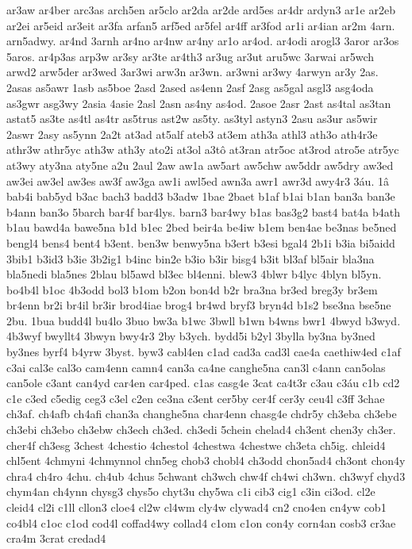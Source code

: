 {ar3aw
ar4ber
arc3as
arch5en
ar5clo
ar2da
ar2de
ard5es
ar4dr
ardyn3
ar1e
ar2eb
ar2ei
ar5eid
ar3eit
ar3fa
arfan5
arf5ed
ar5fel
ar4ff
ar3fod
ar1i
ar4ian
ar2m
4arn.
arn5adwy.
ar4nd
3arnh
ar4no
ar4nw
ar4ny
ar1o
ar4od.
ar4odi
arogl3
3aror
ar3os
5aros.
ar4p3as
arp3w
ar3sy
ar3te
ar4th3
ar3ug
ar3ut
aru5wc
3arwai
ar5wch
arwd2
arw5der
ar3wed
3ar3wi
arw3n
ar3wn.
ar3wni
ar3wy
4arwyn
ar3y
2as.
2asas
as5awr
1asb
as5boe
2asd
2ased
as4enn
2asf
2asg
as5gal
asgl3
asg4oda
as3gwr
asg3wy
2asia
4asie
2asl
2asn
as4ny
as4od.
2asoe
2asr
2ast
as4tal
as3tan
astat5
as3te
as4tl
as4tr
as5trus
ast2w
as5ty.
as3tyl
astyn3
2asu
as3ur
as5wir
2aswr
2asy
as5ynn
2a2t
at3ad
at5alf
ateb3
at3em
ath3a
athl3
ath3o
ath4r3e
athr3w
athr5yc
ath3w
ath3y
ato2i
at3ol
a3tô
at3ran
atr5oc
at3rod
atro5e
atr5yc
at3wy
aty3na
aty5ne
a2u
2aul
2aw
aw1a
aw5art
aw5chw
aw5ddr
aw5dry
aw3ed
aw3ei
aw3el
aw3es
aw3f
aw3ga
aw1i
awl5ed
awn3a
awr1
awr3d
awy4r3
3áu.
1â
bab4i
bab5yd
b3ac
bach3
badd3
b3adw
1bae
2baet
b1af
b1ai
b1an
ban3a
ban3e
b4ann
ban3o
5barch
bar4f
bar4lys.
barn3
bar4wy
b1as
bas3g2
bast4
bat4a
b4ath
b1au
bawd4a
bawe5na
b1d
b1ec
2bed
beir4a
be4iw
b1em
ben4ae
be3nas
be5ned
bengl4
bens4
bent4
b3ent.
ben3w
benwy5na
b3ert
b3esi
bgal4
2b1i
b3ia
bi5aidd
3bib1
b3id3
b3ie
3b2ig1
b4inc
bin2e
b3io
b3ir
bisg4
b3it
bl3af
bl5air
bla3na
bla5nedi
bla5nes
2blau
bl5awd
bl3ec
bl4enni.
blew3
4blwr
b4lyc
4blyn
bl5yn.
bo4b4l
b1oc
4b3odd
bol3
b1om
b2on
bon4d
b2r
bra3na
br3ed
breg3y
br3em
br4enn
br2i
br4il
br3ir
brod4iae
brog4
br4wd
bryf3
bryn4d
b1s2
bse3na
bse5ne
2bu.
1bua
budd4l
bu4lo
3buo
bw3a
b1wc
3bwll
b1wn
b4wns
bwr1
4bwyd
b3wyd.
4b3wyf
bwyllt4
3bwyn
bwy4r3
2by
b3ych.
bydd5i
b2yl
3bylla
by3na
by3ned
by3nes
byrf4
b4yrw
3byst.
byw3
cabl4en
c1ad
cad3a
cad3l
cae4a
caethiw4ed
c1af
c3ai
cal3e
cal3o
cam4enn
camn4
can3a
ca4ne
canghe5na
can3l
c4ann
can5olas
can5ole
c3ant
can4yd
car4en
car4ped.
c1as
casg4e
3cat
ca4t3r
c3au
c3áu
c1b
cd2
c1e
c3ed
c5edig
ceg3
c3el
c2en
ce3na
c3ent
cer5by
cer4f
cer3y
ceu4l
c3ff
3chae
ch3af.
ch4afb
ch4afi
chan3a
changhe5na
char4enn
chasg4e
chdr5y
ch3eba
ch3ebe
ch3ebi
ch3ebo
ch3ebw
ch3ech
ch3ed.
ch3edi
5chein
chelad4
ch3ent
chen3y
ch3er.
cher4f
ch3esg
3chest
4chestio
4chestol
4chestwa
4chestwe
ch3eta
ch5ig.
chleid4
chl5ent
4chmyni
4chmynnol
chn5eg
chob3
chobl4
ch3odd
chon5ad4
ch3ont
chon4y
chra4
ch4ro
4chu.
ch4ub
4chus
5chwant
ch3wch
chw4f
ch4wi
ch3wn.
ch3wyf
chyd3
chym4an
ch4ynn
chysg3
chys5o
chyt3u
chy5wa
c1i
cib3
cig1
c3in
ci3od.
cl2e
cleid4
cl2i
c1ll
cllon3
cloe4
cl2w
cl4wm
cly4w
clywad4
cn2
cno4en
cn4yw
cob1
co4bl4
c1oc
c1od
cod4l
coffad4wy
collad4
c1om
c1on
con4y
corn4an
cosb3
cr3ae
cra4m
3crat
credad4
}
